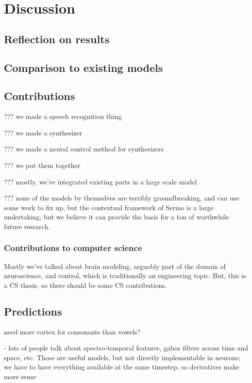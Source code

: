 \chapter{Discussion}

\section{Reflection on results}

\section{Comparison to existing models}

\section{Contributions}

??? we made a speech recognition thing

??? we made a synthesizer

??? we made a neural control method for synthesizers

??? we put them together

??? mostly, we've integrated existing parts in a large scale model

??? none of the models by themselves are terribly groundbreaking,
and can use some work to fix up,
but the contextual framework of Sermo
is a large undertaking,
but we believe it can provide the basis
for a ton of worthwhile future research.

\subsection{Contributions to computer science}

Mostly we've talked about brain modeling,
arguably part of the domain of neuroscience,
and control, which is traditionally an engineering topic.
But, this is a CS thesis, so there should be some CS contributions.

\section{Predictions}

need more cortex for consonants than vowels?

- lots of people talk about spectro-temporal features,
  gabor filters across time and space, etc.
  Those are useful models, but not directly implementable
  in neurons; we have to have everything available at
  the same timestep, so derivatives make more sense

